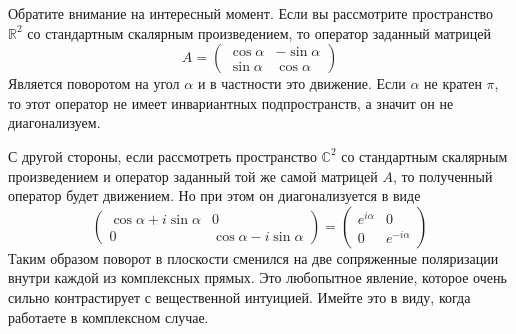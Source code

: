 Обратите внимание на интересный момент.
Если вы рассмотрите пространство $\mathbb R^2$ со стандартным скалярным произведением, то оператор заданный матрицей
\[
A =
\begin{pmatrix}
{\cos \alpha}&{-\sin\alpha}\\
{\sin \alpha}&{\cos \alpha}
\end{pmatrix}
\]
Является поворотом на угол $\alpha$ и в частности это движение.
Если $\alpha$ не кратен $\pi$, то этот оператор не имеет инвариантных подпространств, а значит он не диагонализуем.

С другой стороны, если рассмотреть пространство $\mathbb C^2$ со стандартным скалярным произведением  и оператор заданный той же самой матрицей $A$, то полученный оператор будет движением.
Но при этом он диагонализуется в виде
\[
\begin{pmatrix}
{\cos \alpha + i\sin \alpha}&{0}\\
{0}&{\cos \alpha - i\sin \alpha}
\end{pmatrix}
=
\begin{pmatrix}
{e^{i\alpha}}&{0}\\
{0}&{e^{-i\alpha}}
\end{pmatrix}
\]
Таким образом поворот в плоскости сменился на две сопряженные поляризации внутри каждой из комплексных прямых.
Это любопытное явление, которое очень сильно контрастирует с вещественной интуицией.
Имейте это в виду, когда работаете в комплексном случае.
